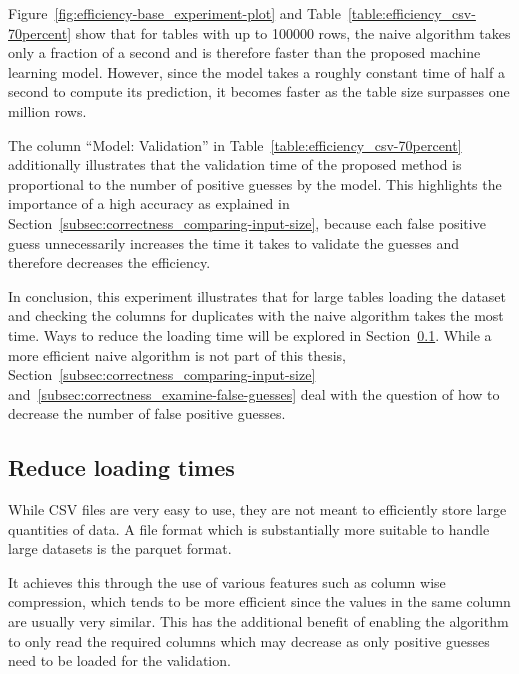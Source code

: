 Figure~\ref{fig:efficiency-base_experiment-plot} and Table~\ref{table:efficiency_csv-70percent} show that for tables with up to \num{100000} rows, the naive algorithm takes only a fraction of a second and is therefore faster than the proposed machine learning model. However, since the model takes a roughly constant time of half a second to compute its prediction, it becomes faster as the table size surpasses one million rows.

The column \enquote{Model: Validation} in Table~\ref{table:efficiency_csv-70percent} additionally illustrates that the validation time of the proposed method is proportional to the number of positive guesses by the model. This highlights the importance of a high accuracy as explained in Section~\ref{subsec:correctness_comparing-input-size}, because each false positive guess unnecessarily increases the time it takes to validate the guesses and therefore decreases the efficiency.

In conclusion, this experiment illustrates that for large tables loading the dataset and checking the columns for duplicates with the naive algorithm takes the most time. Ways to reduce the loading time will be explored in Section~\ref{subsec:efficiency-shorter_loading_times}. While a more efficient naive algorithm is not part of this thesis, Section~\ref{subsec:correctness_comparing-input-size} and~\ref{subsec:correctness_examine-false-guesses} deal with the question of how to decrease the number of false positive guesses.






\subsection{Reduce loading times}\label{subsec:efficiency-shorter_loading_times}
While CSV files are very easy to use, they are not meant to efficiently store large quantities of data. A file format which is substantially more suitable to handle large datasets is the parquet format\cite{parquet-book}.

It achieves this through the use of various features such as column wise compression, which tends to be more efficient since the values in the same column are usually very similar. This has the additional benefit of enabling the algorithm to only read the required columns which may decrease \io{} as only positive guesses need to be loaded for the validation.


